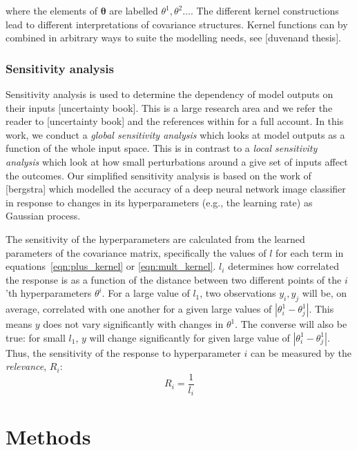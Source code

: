 \documentclass[journal=jacsat,manuscript=article]{achemso}
\begin{document}
where the elements of $\bm{\theta}$ are labelled $\theta^{1}, \theta^{2} \ldots$. The different kernel constructions lead to different interpretations of covariance structures.  Kernel functions can by combined in arbitrary ways to suite the modelling needs, see [duvenand thesis]. 

\subsubsection{Sensitivity analysis}

Sensitivity analysis is used to determine the dependency of model outputs on their inputs [uncertainty book]. This is a large research area and we refer the reader to [uncertainty book] and the references within for a full account.  In this work, we conduct a \emph{global sensitivity analysis} which looks at model outputs as a function of the whole input space. This is in contrast to a \emph{local sensitivity analysis} which look at  how small perturbations around a give set of inputs affect the outcomes.  Our simplified sensitivity analysis is based on the work of [bergstra] which modelled the accuracy of a deep neural network image classifier in response to changes in its hyperparameters (e.g., the learning rate) as Gaussian process.  

The sensitivity of the hyperparameters are calculated from the learned parameters of the covariance matrix, specifically the values of $l$ for each term in equations~\ref{eqn:plus_kernel} or \ref{eqn:mult_kernel}.  $l_{i}$  determines how correlated the response is as a function of the distance between two different points of the $i$'th hyperparameters $\theta^{i}$. For a large value of $l_{1}$, two observations $y_{i}, y_{j}$ will be, on average, correlated with one another for a given large values of $|\theta_{i}^{1} - \theta_{j}^{1}|$. This means $y$ does not vary significantly with changes in $\theta^{1}$. The converse will also be true: for small $l_{1}$, $y$ will change significantly for given large value of $|\theta_{i}^{1} - \theta_{j}^{1}|$. Thus, the sensitivity of the response to hyperparameter $i$ can be measured by the \emph{relevance}, $R_{i}$: 
\begin{equation}\label{eqn:relevance_def}
    R_{i} = \frac{1}{l_{i}}
\end{equation}

\section{Methods}
\end{document}
